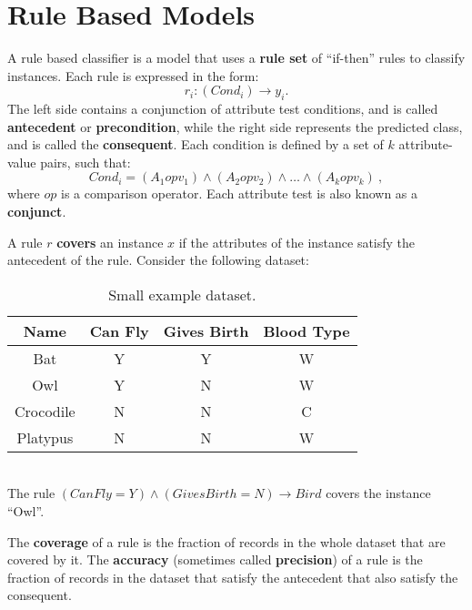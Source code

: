 \chapter{Rule Based Models}

A rule based classifier is a model that uses a \textbf{rule set} of ``if-then'' rules to classify instances. Each rule is expressed in the form:
\begin{equation*}
    r_i : (Cond_i) \xrightarrow{} y_i.
\end{equation*}
The left side contains a conjunction of attribute test conditions, and is called \textbf{antecedent} or \textbf{precondition}, while the right side represents the predicted class, and is called the \textbf{consequent}. Each condition is defined by a set of $k$ attribute-value pairs, such that:
\begin{equation*}
    Cond_i = (A_1 op v_1) \land (A_2 op v_2) \land \dots \land (A_k op v_k) \ ,
\end{equation*}
where $op$ is a comparison operator. Each attribute test is also known as a \textbf{conjunct}.

A rule $r$ \textbf{covers} an instance $x$ if the attributes of the instance satisfy the antecedent of the rule. Consider the following dataset:
\begin{table}[h]
    \centering
    \begin{tabular}{|c|c|c|c|}
    \hline
        Name & Can Fly & Gives Birth & Blood Type \\
    \hline
    \hline
        Bat & Y & Y & W \\
    \hline
        Owl & Y & N & W \\
    \hline
        Crocodile & N & N & C \\
    \hline
        Platypus & N & N & W \\
    \hline
    \end{tabular}
    \caption{Small example dataset.}
    \label{tab:small_dataset}
\end{table}
\\The rule $(Can Fly = Y) \land (Gives Birth = N) \xrightarrow{} Bird$ covers the instance ``Owl''.

The \textbf{coverage} of a rule is the fraction of records in the whole dataset that are covered by it. The \textbf{accuracy} (sometimes called \textbf{precision}) of a rule is the fraction of records in the dataset that satisfy the antecedent that also satisfy the consequent.

